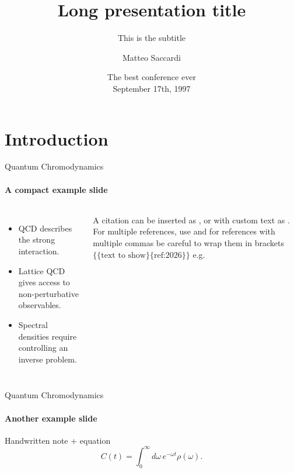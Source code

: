 \documentclass[10pt,aspectratio=43]{beamer}
\title{Long presentation title}
\subtitle{This is the subtitle}
\author[Matteo Saccardi]{Matteo Saccardi}
\date{The best conference ever\\ September 17th, 1997}
\begin{document}
\titlepageframe
\outlineframe

\section{Introduction}

\begin{frame}{Quantum Chromodynamics}
\framesubtitle{A compact example slide}

\begin{columns}[T,onlytextwidth]
  \begin{itemize}
    \item QCD describes the strong interaction.
    \item Lattice QCD gives access to non-perturbative observables.
    \item Spectral densities require controlling an inverse problem.
  \end{itemize}

  \vspace{0.25cm}
  A citation can be inserted as , or with custom
  text as .
  For multiple references, use 
  and for references with multiple commas be careful to wrap them in brackets $\{ \{\text{text to show}\} \{\text{ref:2026}\}\}$ e.g.

  \centering
\end{columns}

\end{frame}

\begin{frame}{Quantum Chromodynamics}
\framesubtitle{Another example slide}
  \vspace{0.25cm}

  \vspace{0.25cm}
  \begin{Handwriting}
    Handwritten note + equation
    \begin{equation}
      C(t) = \int_0^\infty d\omega\, e^{-\omega t}\rho(\omega).
    \end{equation}
  \end{Handwriting}


\end{frame}
\end{document}
